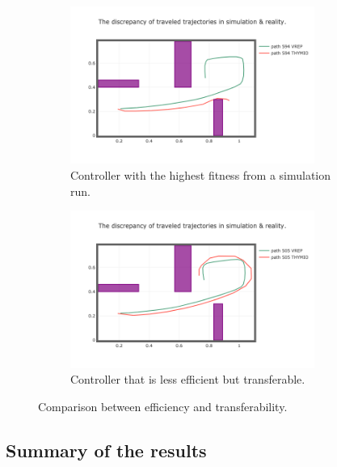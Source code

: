 \begin{figure}[H]
    \centering
    \begin{subfigure}[b]{0.8\textwidth}
    	\centering
        \includegraphics[width=8cm]{include/images/fit_not_transferable.PNG}
        \caption{Controller with the highest fitness from a simulation run.}
        \label{fig:sim_bad_transfer}
    \end{subfigure}
    \begin{subfigure}[b]{0.8\textwidth}
    	\centering
        \includegraphics[width=8cm]{include/images/moea_sim_18_505.PNG}
        \caption{Controller that is less efficient but transferable.}
        \label{fig:sim_good_transfer}
    \end{subfigure}
    \caption{Comparison between efficiency and transferability.}
	\label{fig:comparison_efficiency_transferability}
\end{figure}

\subsection{Summary of the results}

